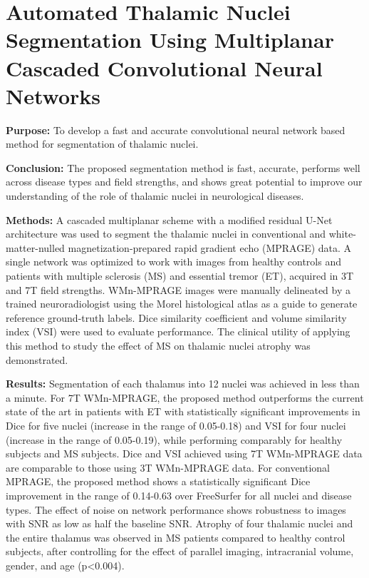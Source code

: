 % 
\chapter{Automated Thalamic Nuclei Segmentation Using Multiplanar Cascaded Convolutional Neural Networks}


\textbf{Purpose:} To develop a fast and accurate convolutional neural network based method for segmentation of thalamic nuclei.

\textbf{Conclusion:} The proposed segmentation method is fast, accurate, performs well across disease types and field strengths, and shows great potential to improve our understanding of the role of thalamic nuclei in neurological diseases. 

\textbf{Methods:} A cascaded multiplanar scheme with a modified residual U-Net architecture was used to segment the thalamic nuclei in conventional and white-matter-nulled magnetization-prepared rapid gradient echo (MPRAGE) data. A single network was optimized to work with images from healthy controls and patients with multiple sclerosis (MS) and essential tremor (ET), acquired in 3T and 7T field strengths. WMn-MPRAGE images were manually delineated by a trained neuroradiologist using the Morel histological atlas as a guide to generate reference ground-truth labels. Dice similarity coefficient and volume similarity index (VSI) were used to evaluate performance. The clinical utility of applying this method to study the effect of MS on thalamic nuclei atrophy was demonstrated. 

\textbf{Results:} Segmentation of each thalamus into 12 nuclei was achieved in less than a minute. For 7T WMn-MPRAGE, the proposed method outperforms the current state of the art in patients with ET with statistically significant improvements in Dice for five nuclei (increase in the range of 0.05-0.18) and VSI for four nuclei (increase in the range of 0.05-0.19), while performing comparably for healthy subjects and MS subjects. Dice and VSI achieved using 7T WMn-MPRAGE data are comparable to those using 3T WMn-MPRAGE data. For conventional MPRAGE, the proposed method shows a statistically significant Dice improvement in the range of 0.14-0.63 over FreeSurfer for all nuclei and disease types. The effect of noise on network performance shows robustness to images with SNR as low as half the baseline SNR. Atrophy of four thalamic nuclei and the entire thalamus was observed in MS patients compared to healthy control subjects, after controlling for the effect of parallel imaging, intracranial volume, gender, and age (p{\textless}0.004).


